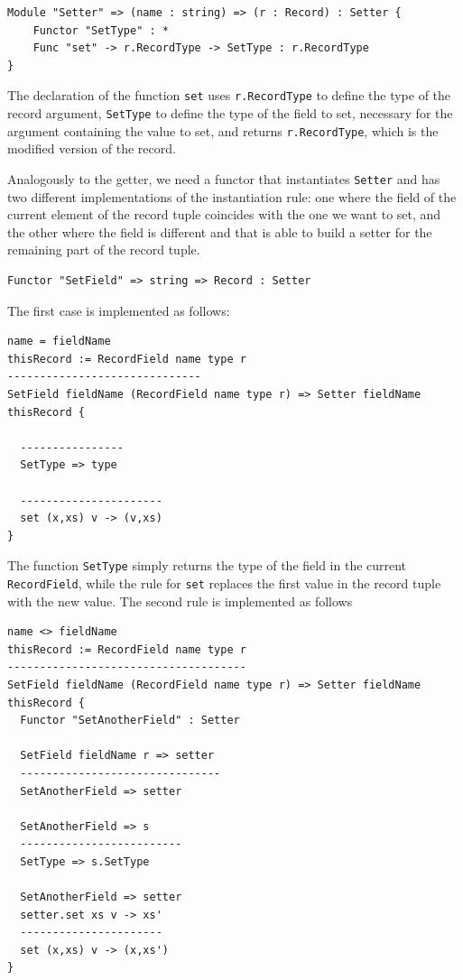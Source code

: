 \begin{lstlisting}
Module "Setter" => (name : string) => (r : Record) : Setter {
	Functor "SetType" : *
	Func "set" -> r.RecordType -> SetType : r.RecordType
}
\end{lstlisting}

\noindent
The declaration of the function \texttt{set} uses \texttt{r.RecordType} to define the type of the record argument, \texttt{SetType} to define the type of the field to set, necessary for the argument containing the value to set, and returns \texttt{r.RecordType}, which is the modified version of the record.

Analogously to the getter, we need a functor that instantiates \texttt{Setter} and has two different implementations of the instantiation rule: one where the field of the current element of the record tuple coincides with the one we want to set, and the other where the field is different and that is able to build a setter for the remaining part of the record tuple.

\begin{lstlisting}
Functor "SetField" => string => Record : Setter
\end{lstlisting}

The first case is implemented as follows:

\begin{lstlisting}[caption = Setting a field (case 1), label = lst:ch_functors_setter1]
name = fieldName
thisRecord := RecordField name type r
------------------------------
SetField fieldName (RecordField name type r) => Setter fieldName thisRecord {

  ----------------
  SetType => type
  
  ----------------------
  set (x,xs) v -> (v,xs)
}
\end{lstlisting}

\noindent
The function \texttt{SetType} simply returns the type of the field in the current \texttt{RecordField}, while the rule for \texttt{set} replaces the first value in the record tuple with the new value. The second rule is implemented as follows

\begin{lstlisting}[caption = Setting a field (case 2), label = lst:ch_functors_setter2]
name <> fieldName
thisRecord := RecordField name type r
-------------------------------------
SetField fieldName (RecordField name type r) => Setter fieldName thisRecord {
  Functor "SetAnotherField" : Setter
  
  SetField fieldName r => setter
  -------------------------------
  SetAnotherField => setter
  
  SetAnotherField => s
  -------------------------
  SetType => s.SetType
  
  SetAnotherField => setter
  setter.set xs v -> xs'
  ----------------------
  set (x,xs) v -> (x,xs')
}
\end{lstlisting}

